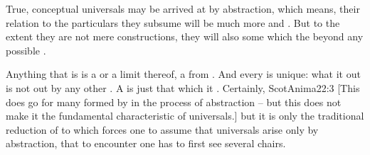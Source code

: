 True, conceptual universals may be arrived at by abstraction, which means, their
relation to the particulars they subsume will be much more  and
. But to the extent they are not mere  constructions,
they will also  some  which 
the  beyond any possible .

\pa
Anything that is is a  or a limit thereof, a  from
.  And every  is unique: what it
 out is not  out by any other .  A  is
just that which it .  Certainly, \citet{it is impossible to
abstract universals from the singular without previous knowledge of
the singular}{ScotAnima}{22:3 [This does go for 
many  formed by  in the process of 
abstraction -- but this does not make it the fundamental 
characteristic of universals.]}
but it is only the traditional reduction of
 to  which forces one to assume that universals 
arise only by abstraction, that to encounter  one has to first see
several chairs. 
%
